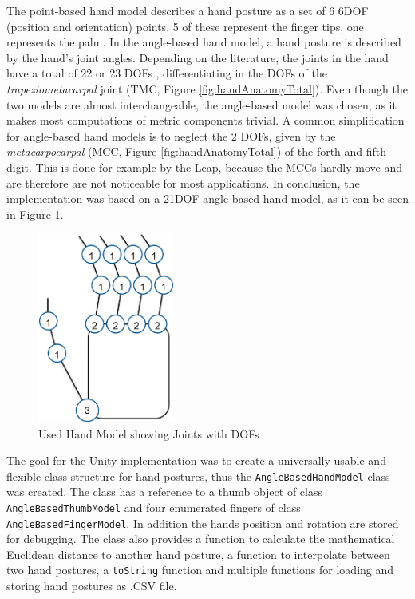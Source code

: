 The point-based hand model describes a hand posture as a set of 6 6DOF (position and orientation) points. 5 of these represent the finger tips, one represents the palm. In the angle-based hand model, a hand posture is described by the hand's joint angles. Depending on the literature, the joints in the hand have a total of 22 \cite{su1994logical} or 23 DOFs \cite{laviola1999survey}, differentiating in the DOFs of the \textit{trapeziometacarpal} joint (TMC, Figure \ref{fig:handAnatomyTotal}).
Even though the two models are almost interchangeable, the angle-based model was chosen, as it makes most computations of metric components trivial. A common simplification for angle-based hand models is to neglect the 2 DOFs, given by the \textit{metacarpocarpal} (MCC, Figure \ref{fig:handAnatomyTotal}) of the forth and fifth digit. This is done for example by the Leap, because the MCCs hardly move and are therefore are not noticeable for most applications. 
In conclusion, the implementation was based on a 21DOF angle based hand model, as it can be seen in Figure \ref{fig:anglehand}.

\begin{figure}[h]
\centering
\includegraphics[width=0.40\textwidth]{anglehand}
\caption{Used Hand Model showing Joints with DOFs}
\label{fig:anglehand}
\end{figure}

The goal for the Unity implementation was to create a universally usable and flexible class structure for hand postures, thus the \texttt{AngleBasedHandModel} class was created. The class has a reference to a thumb object of class \texttt{AngleBasedThumbModel} and four enumerated fingers of class \texttt{AngleBasedFingerModel}. In addition the hands position and rotation are stored for debugging. The class also provides a function to calculate the mathematical Euclidean distance to another hand posture, a function to interpolate between two hand postures, a \texttt{toString} function and multiple functions for loading and storing hand postures as .CSV file. 

